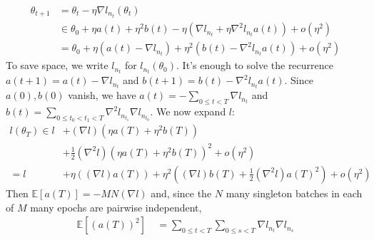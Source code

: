 \documentclass[openany, notitlepage, justified]{tufte-book}
\theoremstyle{plain}
\theoremstyle{definition}
\newcommand{\expct}[1]{\mathbb{E}\left[#1\right]}
\begin{document}
            \begin{shaded}
                \begin{align*}
                    \theta_{t+1} &=     \theta_t - \eta \nabla l_{n_t} (\theta_t) \\
                                 &\in       \theta_0
                                        +   \eta a(t) + \eta^2 b(t)
                                        -   \eta (
                                                    \nabla l_{n_t}
                                                +   \eta \nabla^2 l_{n_t} a(t) 
                                            )
                                        +   o(\eta^2) \\
                                 &=     \theta_0
                                    +   \eta (a(t) - \nabla l_{n_t})
                                    +   \eta^2 (b(t) - \nabla^2 l_{n_t} a(t)) 
                                    +   o(\eta^2)
                \end{align*}
                To save space, we write $l_{n_t}$ for $l_{n_t}(\theta_0)$.  It's
                enough to solve the recurrence $a(t+1) = a(t) - \nabla l_{n_t}$ and
                $b(t+1) = b(t) - \nabla^2 l_{n_t} a(t)$.  Since $a(0), b(0)$
                vanish, we have $a(t) =-\sum_{0\leq t<T} \nabla l_{n_t}$ and $b(t)
                = \sum_{0\leq t_0 < t_1 < T} \nabla^2 l_{n_{t_1}} \nabla
                l_{n_{t_0}}$.  We now expand $l$:
                \begin{align*}
                    l(\theta_T) \in    l   &+   (\nabla l) (\eta a(T) + \eta^2 b(T)) \\
                                           &+   \frac{1}{2} (\nabla^2 l) (\eta a(T) + \eta^2 b(T))^2
                                            +   o(\eta^2) \\
                                =      l   &+   \eta ((\nabla l) a(T))
                                            +   \eta^2 ((\nabla l) b(T) + \frac{1}{2} (\nabla^2 l) a(T)^2 )
                                            +   o(\eta^2)
                \end{align*}
                Then $\expct{a(T)} = -MN(\nabla l)$ and, since the $N$ many
                singleton batches in each of $M$ many epochs are pairwise
                independent,
                \begin{align*}
                    \expct{(a(T))^2}
                    ~&=
                    \sum_{0\leq t<T} \sum_{0\leq s<T} \nabla l_{n_t} \nabla l_{n_s} \\

\end{align*}
\end{shaded}
\end{document}
